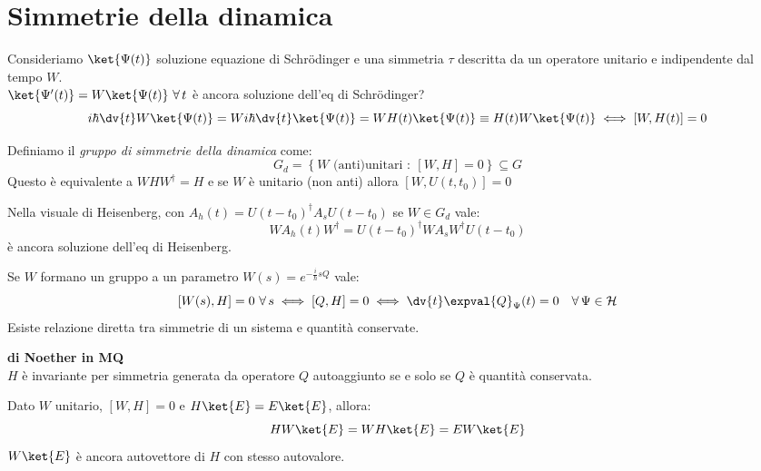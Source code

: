 \section{Simmetrie della dinamica}
Consideriamo \(\ket{\Psi(t)}\) soluzione equazione di Schrödinger e una simmetria \(\tau\) descritta da un operatore unitario e indipendente dal tempo \(W\).\\
\(\ket{\Psi'(t)}= W\ket{\Psi(t)} \ \forall\,t \) è ancora soluzione dell'eq di Schrödinger? 
\[
    i\hbar\dv{t}W\ket{\Psi(t)} =   W i\hbar \dv{t}\ket{\Psi(t)} = W H(t)\ket{\Psi(t)} \equiv H(t)W\ket{\Psi(t)}  \iff \left[ W, H(t) \right]=0
\]

\begin{definition}
    Definiamo il \textit{gruppo di simmetrie della dinamica} come:
    \begin{equation}
        G_d = \left\{ W \text{ (anti)unitari }  : \ \left[ W, H \right]=0 \right\} \subseteq G
    \end{equation}
    Questo è equivalente a \(WHW^\dagger= H\) e se \(W\) è unitario (non anti) allora \(\left[ W, U(t,t_0) \right]=0\)
\end{definition}

Nella visuale di Heisenberg, con \(A_h(t)= U(t-t_0)^\dagger A_s U(t-t_0)\)
se \(W \in G_d\) vale:
\[
    WA_h(t)W^\dagger = U(t-t_0)^\dagger W A_s W^\dagger U(t-t_0)
\]
è ancora soluzione dell'eq di Heisenberg.

Se \(W\) formano un gruppo a un parametro \(W(s)= e^{-\frac{i}{\hbar}sQ}\) vale:
\begin{equation}
    \left[ W(s), H \right]= 0 \ \forall\, s \iff \left[ Q, H \right]    =0 \iff \dv{t} \expval{Q}_\Psi (t)=0 \quad \forall\, \Psi \in \mathcal{H}
\end{equation}
Esiste relazione diretta tra simmetrie di un sistema e quantità conservate.

\begin{theorem}\label{theo: Noether}
    {\normalfont\textbf{di Noether in MQ}}\\
    \(H\) è invariante per simmetria generata da operatore \(Q\) autoaggiunto se e solo se \(Q\) è quantità conservata.
\end{theorem}

\begin{remark}
    Dato \(W\) unitario, \(\left[ W, H \right]=0\) e \(H\ket{E}= E\ket{E}\), allora:
    \begin{equation}
        HW\ket{E} = WH\ket{E}= EW\ket{E}
    \end{equation}
    \(W\ket{E}\) è ancora autovettore di \(H\) con stesso autovalore.
\end{remark}

